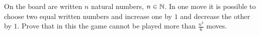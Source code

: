 \begin{problem} [Serbia 2022]
    On the board are written $n$ natural numbers, $n\in \mathbb N$. In one move it is possible to choose two equal written numbers and increase one by $1$ and decrease the other by $1$. Prove that in this the game cannot be played more than $\frac{n^3}{6}$ moves.

\end{problem}

